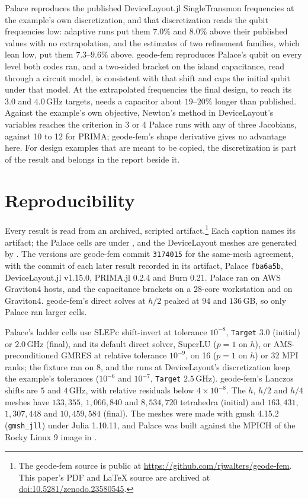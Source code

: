 \documentclass{anvil-paper}
\begin{document}
Palace reproduces the published DeviceLayout.jl SingleTransmon
frequencies at the example's own discretization, and that discretization
reads the qubit frequencies low: adaptive runs put them $7.0\%$ and $8.0\%$
above their published values with no extrapolation, and the estimates of
two refinement families, which lean low, put them $7.3$--$9.6\%$ above. geode-fem
reproduces Palace's qubit on every level both codes ran, and a two-sided
bracket on the island capacitance, read through a circuit model, is
consistent with that shift and caps the initial qubit under that model.
At the extrapolated frequencies the final design, to reach its $3.0$ and
$4.0$\,GHz targets, needs a capacitor about $19$--$20\%$ longer than
published. Against the example's own objective, Newton's method in DeviceLayout's
variables reaches the criterion in 3 or 4 Palace runs with any of three
Jacobians, against 10 to 12 for PRIMA; geode-fem's shape derivative gives
no advantage here. For design examples that are meant to be
copied, the discretization is part of the result and belongs in the report
beside it.

\section{Reproducibility}
\label{sec:repro}

Every result is read from an archived, scripted artifact.\footnote{The geode-fem source is public at
\url{https://github.com/rjwalters/geode-fem}. This paper's PDF and \LaTeX{}
source are archived at
\href{https://doi.org/10.5281/zenodo.23580545}{doi:10.5281/zenodo.23580545}.}
Each caption names its artifact; the Palace cells are under
, and the DeviceLayout meshes are
generated by . The versions are geode-fem commit
\texttt{3174015} for the same-mesh agreement, with the commit of each later
result recorded in its artifact, Palace \texttt{fba6a5b}, DeviceLayout.jl
v1.15.0, PRIMA.jl 0.2.4 and Burn 0.21. Palace ran on AWS
Graviton4 hosts, and the capacitance brackets on a 28-core workstation and
on Graviton4. geode-fem's
direct solves at $h/2$ peaked at $94$ and $136$\,GB, so only Palace ran
larger cells.

Palace's ladder cells use SLEPc shift-invert at tolerance $10^{-8}$,
\texttt{Target} $3.0$ (initial) or $2.0$\,GHz (final), and its default
direct solver, SuperLU ($p = 1$ on $h$), or AMS-preconditioned GMRES at relative
tolerance $10^{-9}$, on 16 ($p = 1$ on $h$) or 32 MPI ranks; the fixture ran
on 8, and the runs at DeviceLayout's discretization keep the example's
tolerances ($10^{-6}$ and $10^{-7}$, \texttt{Target} $2.5$\,GHz). geode-fem's Lanczos shifts are
$5$ and $4$\,GHz, with relative residuals below $4\times10^{-8}$.
The $h$, $h/2$ and $h/4$ meshes have $133{,}355$, $1{,}066{,}840$ and
$8{,}534{,}720$ tetrahedra (initial) and $163{,}431$, $1{,}307{,}448$ and
$10{,}459{,}584$ (final). The meshes were made
with gmsh 4.15.2 (\texttt{gmsh\_jll}) under Julia 1.10.11, and Palace was
built against the MPICH of the Rocky Linux 9 image in
.
\end{document}
